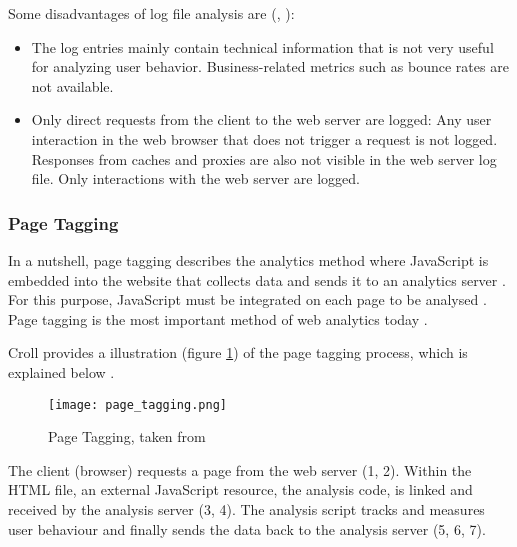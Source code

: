 
Some disadvantages of log file analysis are (\cite{2011Marek}, \cite{2015Zheng}):

\begin{itemize}
\item The log entries mainly contain technical information that is not very useful for analyzing user behavior. Business-related metrics such as bounce rates are not available. %
\item Only direct requests from the client to the web server are logged: Any user interaction in the web browser that does not trigger a request is not logged. Responses from caches and proxies are also not visible in the web server log file. Only interactions with the web server are logged.
\end{itemize}



\subsubsection{Page Tagging} %
\label{subsubsection:page_tagging}

In a nutshell, page tagging describes the analytics method where JavaScript is embedded into the website that collects data and sends it to an analytics server \cite{2011Marek}.
For this purpose, JavaScript must be integrated on each page to be analysed \cite{2009Waisberg}.
Page tagging is the most important method of web analytics today \cite{2015Zheng}.

Croll provides a illustration (figure \ref{figure:page_tagging}) of the page tagging process, which is explained below \cite{2009Croll}.

\begin{figure}[h!]
\begin{center}
\texttt{[image: page\_tagging.png]}
\caption{Page Tagging, taken from \cite{2009Croll}}
\label{figure:page_tagging}
\end{center}
\end{figure}

The client (browser) requests a page from the web server (1, 2).
Within the HTML file, an external JavaScript resource, the analysis code, is linked and received by the analysis server (3, 4).
The analysis script tracks and measures user behaviour and finally sends the data back to the analysis server (5, 6, 7).


